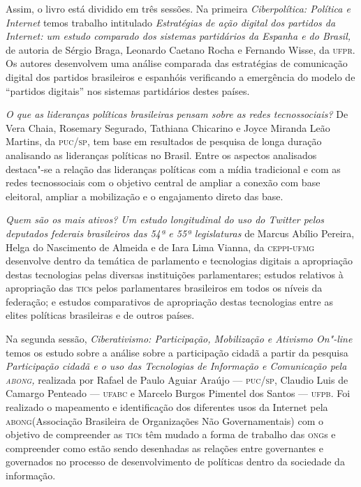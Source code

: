 Assim, o livro está dividido em três sessões. Na primeira
\emph{Ciberpolítica: \emph{Política e Internet }}temos trabalho
intitulado \emph{Estratégias de ação digital dos partidos da Internet:
um estudo comparado dos sistemas partidários da Espanha e do Brasil,} de
autoria de Sérgio Braga, Leonardo Caetano Rocha e Fernando Wisse, da
\textsc{ufpr}. Os autores desenvolvem uma análise comparada das estratégias de
comunicação digital dos partidos brasileiros e espanhóis verificando a
emergência do modelo de ``partidos digitais'' nos sistemas partidários
destes países.

\emph{O que as lideranças políticas brasileiras pensam sobre as redes
tecnossociais?} De Vera Chaia, Rosemary Segurado, Tathiana Chicarino e
Joyce Miranda Leão Martins, da \textsc{puc}/\textsc{sp}, tem base em resultados de
pesquisa de longa duração analisando as lideranças políticas no Brasil.
Entre os aspectos analisados destaca"-se a relação das lideranças
políticas com a mídia tradicional e com as redes tecnossociais com o
objetivo central de ampliar a conexão com base eleitoral, ampliar a
mobilização e o engajamento direto das base.

\emph{Quem são os mais ativos? Um estudo longitudinal do uso do Twitter
pelos deputados federais brasileiros das 54ª e 55ª legislaturas} de
Marcus Abílio Pereira, Helga do Nascimento de Almeida e de Iara Lima
Vianna, da \textsc{ceppi}-\textsc{ufmg} desenvolve dentro da temática de parlamento e
tecnologias digitais a apropriação destas tecnologias pelas diversas
instituições parlamentares; estudos relativos à apropriação das \textsc{tic}s
pelos parlamentares brasileiros em todos os níveis da federação; e
estudos comparativos de apropriação destas tecnologias entre as elites
políticas brasileiras e de outros países.

Na segunda sessão, \emph{Ciberativismo: Participação, Mobilização e
Ativismo On"-line} temos os estudo sobre a análise sobre a participação
cidadã a partir da pesquisa \emph{Participação cidadã e o uso das
Tecnologias de Informação e Comunicação pela \textsc{abong},} realizada por
Rafael de Paulo Aguiar Araújo --- \textsc{puc}/\textsc{sp}, Claudio Luis de Camargo Penteado
--- \textsc{ufabc} e Marcelo Burgos Pimentel dos Santos --- \textsc{ufpb}. Foi realizado o
mapeamento e identificação dos diferentes usos da Internet pela
\textsc{abong}(Associação Brasileira de Organizações Não Governamentais) com o
objetivo de compreender as \textsc{tic}s têm mudado a forma de trabalho das \textsc{ong}s
e compreender como estão sendo desenhadas as relações entre governantes
e governados no processo de desenvolvimento de políticas dentro da
sociedade da informação.

